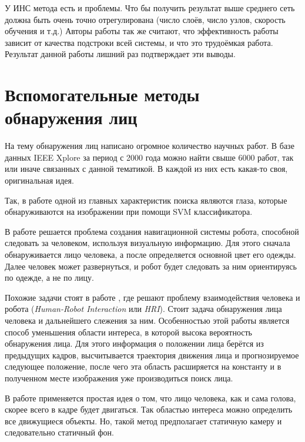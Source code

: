 \documentclass[12pt]{report}
\begin{document}
 У ИНС метода есть и проблемы. Что бы получить результат выше среднего сеть должна быть очень точно отрегулирована 
(число слоёв, число узлов, скорость обучения и т.д.) \citep{jee2004eye} Авторы работы \citep{capi2010vision} так же 
считают, что эффективность работы зависит от качества подстроки всей системы, и что это трудоёмкая работа. 
Результат 
данной работы лишний раз подтверждает эти выводы.

\section{Вспомогательные методы обнаружения лиц}

На тему обнаружения лиц написано огромное количество научных работ. В базе данных IEEE Xplore за период с 2000 года 
можно найти свыше 6000 работ, так или иначе связанных с данной тематикой. В каждой из них есть какая-то своя, 
оригинальная идея.

Так, в работе \citep{jee2004eye} одной из главных характеристик поиска являются глаза, которые обнаруживаются на 
изображении при помощи SVM классификатора.

В работе \citep{capi2010vision} решается проблема создания навигационной системы робота, способной следовать за 
человеком, используя визуальную информацию. Для этого сначала обнаруживается лицо человека, а после определяется 
основной цвет его одежды. Далее человек может развернуться, и робот будет следовать за ним ориентируясь по одежде, 
а не по лицу.

Похожие задачи стоят в работе \citep{luo2007face}, где решают проблему взаимодействия человека и робота (\textit
{Human-Robot Interaction} или \textit{HRI}). Стоит задача обнаружения лица человека и дальнейшего слежения за ним. 
Особенностью этой работы является способ уменьшения области интереса, в которой высока вероятность обнаружения 
лица. 
Для этого информация о положении лица берётся из предыдущих кадров, высчитывается траектория движения лица и 
прогнозируемое следующее положение, после чего эта область расширяется на константу и в полученном месте 
изображения 
уже производиться поиск лица.

В работе \citep{zhang2010fast} применяется простая идея о том, что лицо человека, как и сама голова, скорее всего в 
кадре будет двигаться. Так областью интереса можно определить все движущиеся объекты. Но, такой метод предполагает 
статичную камеру и следовательно статичный фон.

\end{document}
